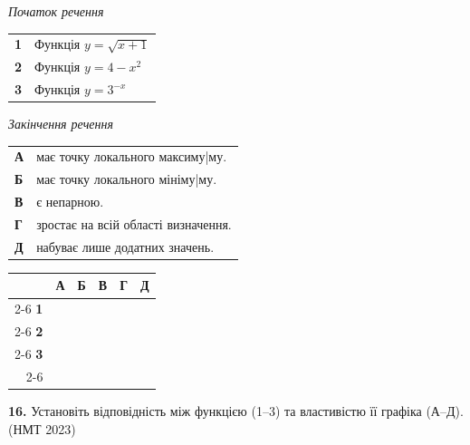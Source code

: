 \documentclass[14pt]{extarticle}
\newcommand{\answerGrid}{
    \begingroup
    \setlength{\tabcolsep}{4pt}
    \renewcommand{\arraystretch}{1.2}
    \small
    \begin{tabular}{r|c|c|c|c|c|}
         \multicolumn{1}{c}{} & \multicolumn{1}{c}{\textbf{А}} & \multicolumn{1}{c}{\textbf{Б}} & \multicolumn{1}{c}{\textbf{В}} & \multicolumn{1}{c}{\textbf{Г}} & \multicolumn{1}{c}{\textbf{Д}} \\ \cline{2-6}
         \textbf{1} & & & & & \\ \cline{2-6}
         \textbf{2} & & & & & \\ \cline{2-6}
         \textbf{3} & & & & & \\ \cline{2-6}
    \end{tabular}
    \endgroup
}
\newcommand{\nmtyear}[1]{\hfill{\small\color{yearcolor}(НМТ #1)}}
\begin{document}
\noindent
\begin{minipage}[t]{0.45\textwidth}
    \textit{Початок речення} \par \vspace{0.2cm}
    \begin{tabular}{@{}p{0.5cm} l@{}}
    \textbf{1} & Функція $y = \sqrt{x + 1}$ \\[0.4cm]
    \textbf{2} & Функція $y = 4 - x^2$ \\[0.4cm]
    \textbf{3} & \colorbox{yellow!30}{Функція $y = 3^{-x}$} \\
    \end{tabular}
\end{minipage}%
\hfill
\begin{minipage}[t]{0.50\textwidth}
    \textit{Закінчення речення} \par \vspace{0.2cm}
    \begin{tabular}{@{}p{0.5cm} p{7cm}@{}}
    \textbf{А} & має точку локального максиму|му. \\[0.2cm]
    \textbf{Б} & має точку локального мініму|му. \\[0.2cm]
    \textbf{В} & є непарною. \\[0.2cm]
    \textbf{Г} & зростає на всій області визначення. \\[0.2cm]
    \textbf{Д} & набуває лише додатних значень. \\
    \end{tabular}
\end{minipage}
\vspace{0.3cm}

\answerGrid
\vspace{0.7cm}

\noindent\textbf{16.} Установіть відповідність між функцією (1–3) та властивістю її графіка (А–Д). \nmtyear{2023}
\vspace{0.3cm}
\end{document}
